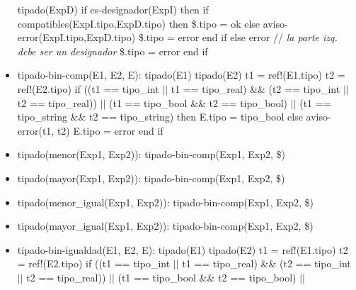 \documentclass[11pt]{article}
\begin{document}
\begin{itemize}
                \subitem tipado(ExpD) 
                \subitem if es-designador(ExpI) then
                    \subsubitem if compatibles(ExpI.tipo,ExpD.tipo) then 
                        \subsubitem \hspace{2em}
                        \$.tipo = ok 
                    \subsubitem else 
                        \subsubitem \hspace{2em} aviso-error(ExpI.tipo,ExpD.tipo) 
                        \subsubitem \hspace{2em} \$.tipo = error 
                    \subsubitem end if 
                \subitem else 
                    \subsubitem error \/// \textit{la parte izq. debe ser un designador}
                    \subsubitem \$.tipo = error 
                \subitem end if
            \item tipado-bin-comp(E1, E2, E): 
                \subitem tipado(E1) 
                \subitem tipado(E2) 
                \subitem t1 = ref!(E1.tipo) 
                \subitem t2 = ref!(E2.tipo) 
                \subitem if ((t1 == tipo\_int $\vert \vert$ t1 == tipo\_real) \&\&  (t2 == tipo\_int $\vert \vert$ t2 == tipo\_real)) $\vert \vert$ 
                    (t1 == tipo\_bool \&\&  t2 == tipo\_bool) $\vert \vert$ 
                    (t1 == tipo\_string \&\&  t2 == tipo\_string) then
                    \subsubitem E.tipo = tipo\_bool
                \subitem else 
                    \subsubitem aviso-error(t1, t2) 
                    \subsubitem E.tipo = error
                \subitem end if
            \item tipado(menor(Exp1, Exp2)):
                \subitem tipado-bin-comp(Exp1, Exp2, \$)
            \item tipado(mayor(Exp1, Exp2)): 
                \subitem tipado-bin-comp(Exp1, Exp2, \$)
            \item tipado(menor\_igual(Exp1, Exp2)): 
                \subitem tipado-bin-comp(Exp1, Exp2, \$)
            \item tipado(mayor\_igual(Exp1, Exp2)): 
                \subitem tipado-bin-comp(Exp1, Exp2, \$)
            \item tipado-bin-igualdad(E1, E2, E): 
                \subitem tipado(E1) 
                \subitem tipado(E2) 
                \subitem t1 = ref!(E1.tipo) 
                \subitem t2 = ref!(E2.tipo) 
                \subitem if ((t1 == tipo\_int $\vert \vert$ t1 == tipo\_real) \&\&  (t2 == tipo\_int $\vert \vert$ t2 == tipo\_real)) $\vert \vert$ 
                    (t1 == tipo\_bool \&\&  t2 == tipo\_bool) $\vert \vert$ 

\end{itemize}
\end{document}
